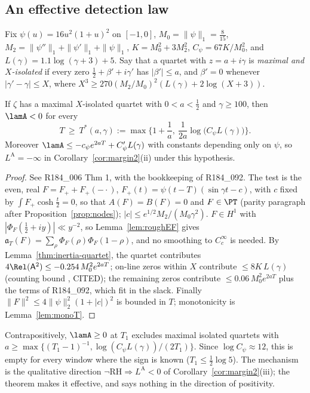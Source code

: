 \subsection{An effective detection law}
Fix $\psi(u)=16u^2(1+u)^2$ on $[-1,0]$, $M_0=\|\psi\|_1=\frac8{15}$, $M_2=\|\psi''\|_1+\|\psi'\|_1+\|\psi\|_1$,
$K=M_0^2+3M_2^2$, $C_\psi=67K/M_0^2$, and $L(\gamma)=1.1\log(\gamma+3)+5$. Say that a quartet with
$z=a+i\gamma$ is \emph{maximal and $X$-isolated} if every zero $\frac12+\beta'+i\gamma'$ has $|\beta'|\le a$, and
$\beta'=0$ whenever $|\gamma'-\gamma|\le X$, where $X^3\ge270(M_2/M_0)^2(L(\gamma)+2\log(X+3))$.

\begin{theorem}\label{thm:inertia-detect}
If $\zeta$ has a maximal $X$-isolated quartet with $0<a<\frac12$ and $\gamma\ge100$, then $\lamA<0$ for every
\[
T\ \ge\ T^*(a,\gamma):=\max\Big\{1+\frac1a,\ \frac1{2a}\log\big(C_\psi L(\gamma)\big)\Big\}.
\]
Moreover $\lamA\le-c_\psi e^{2aT}+C_\psi'L(\gamma)$ with constants depending only on $\psi$, so
$L^{\mathrm A}=-\infty$ in Corollary~\ref{cor:margin2}(ii) under this hypothesis.
\end{theorem}
\begin{proof}
See R184\_006 Thm 1, with the bookkeeping of R184\_092. The test is the even, real
$F=F_++F_+(-\cdot)$, $F_+(t)=\psi(t-T)(\sin\gamma t-c)$, with $c$ fixed by $\int F_+\cosh\frac t2=0$, so that
$A(F)=B(F)=0$ and $F\in\PT$ (parity paragraph after Proposition~\ref{prop:nodes}); $|c|\le e^{1/2}M_2/(M_0\gamma^2)$.
$F\in H^1$ with $|\Phi_F(\frac12+iy)|\ll y^{-2}$, so Lemma~\ref{lem:roughEF} gives
$\mathfrak a_T(F)=\sum_\rho\Phi_F(\rho)\Phi_F(1-\rho)$, and no smoothing to $C_c^\infty$ is needed. By
Lemma~\ref{thm:inertia-quartet}, the quartet contributes $4\Rel(\mathsf A^2)\le-0.254\,M_0^2e^{2aT}$; on-line zeros
within $X$ contribute $\le8K\,L(\gamma)$ (counting bound \cite[Thm.~1]{Trudgian2014}, CITED); the remaining zeros
contribute $\le0.06\,M_0^2e^{2aT}$ plus the terms of R184\_092, which fit in the slack. Finally
$\|F\|^2\le4\|\psi\|_2^2(1+|c|)^2$ is bounded in $T$; monotonicity is Lemma~\ref{lem:monoT}.
\end{proof}
\begin{remark}
Contrapositively, $\lamA\ge0$ at $T_1$ excludes maximal isolated quartets with
$a\ge\max\{(T_1-1)^{-1},\log(C_\psi L(\gamma))/(2T_1)\}$. Since $\log C_\psi\approx12$, this is empty for every window
where the sign is known ($T_1\le\frac12\log5$). The mechanism is the qualitative direction
$\neg\mathrm{RH}\Rightarrow L^{\mathrm A}<0$ of Corollary~\ref{cor:margin2}(iii); the theorem makes it effective, and
says nothing in the direction of positivity.
\end{remark}

